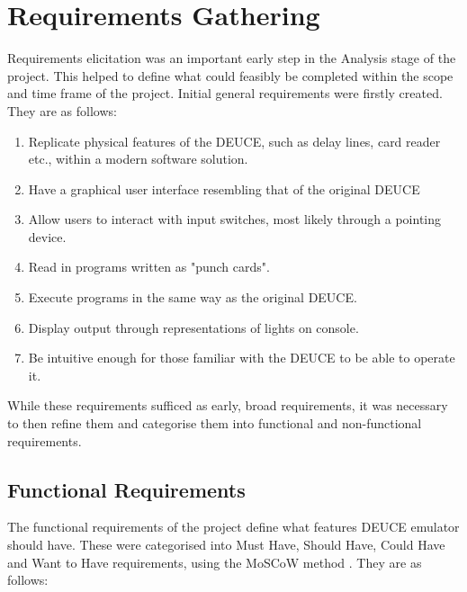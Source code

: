 \documentclass{l4proj}
\begin{document}
\section{Requirements Gathering}
Requirements elicitation was an important early step in the Analysis stage of the project. This helped to define what could feasibly be completed within the scope and time frame of the project. Initial general requirements were firstly created. They are as follows:
\begin{enumerate}
	\item Replicate physical features of the DEUCE, such as delay lines, card reader etc., within a modern software solution.
	\item Have a graphical user interface resembling that of the original DEUCE
	\item Allow users to interact with input switches, most likely through a pointing device.
	\item Read in programs written as "punch cards".
	\item Execute programs in the same way as the original DEUCE.
	\item Display output through representations of lights on console.
	\item Be intuitive enough for those familiar with the DEUCE to be able to operate it.	
\end{enumerate}

While these requirements sufficed as early, broad requirements, it was necessary to then refine them and categorise them into functional and non-functional requirements.

\subsection{Functional Requirements}
The functional requirements of the project define what features DEUCE emulator should have. These were categorised into Must Have, Should Have, Could Have and Want to Have requirements, using the MoSCoW method \citep{Moscow14}. They are as follows:
\\
\end{document}
